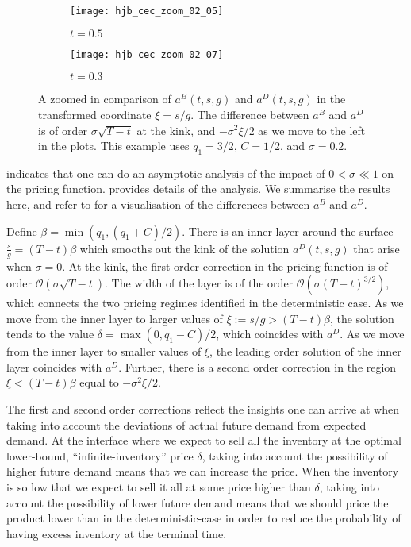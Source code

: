 \documentclass[main.tex]{subfiles}
\begin{document}
\begin{figure}[hbt]
  \centering
  \begin{subfigure}[b]{0.5\textwidth}
    \texttt{[image: hjb\_cec\_zoom\_02\_05]}
    \caption{$t = 0.5$}
  \end{subfigure}%
  \begin{subfigure}[b]{0.5\textwidth}
    \texttt{[image: hjb\_cec\_zoom\_02\_07]}
    \caption{$t=0.3$}
  \end{subfigure}
  \caption{A zoomed in comparison of $a^B(t,s,g)$ and $a^D(t,s,g)$
    in the transformed coordinate $\xi=s/g$.
    The difference between $a^B$ and $a^D$ is of order
    $\sigma\sqrt{T-t}$ at the kink, and
    $-\sigma^2\xi/2$ as we move to the left in the
    plots.
    This example uses $q_1=3/2$, $C=1/2$, and $\sigma=0.2$.
  }\label{fig:hjb_cec_zoom}
\end{figure}
 indicates that one can do an asymptotic analysis
of the impact of $0<\sigma \ll 1$ on the pricing
function.  provides details of the
analysis. We summarise the
results here, and refer to  for a visualisation
of the differences between $a^B$ and $a^D$.
\begin{myresult}\label{res:linear_asymptotics}
  Define $\beta=\min(q_1,(q_1+C)/2)$.
  There is an inner layer around the surface $\frac{s}{g}=(T-t)\beta$ which
  smooths out the kink of the solution $a^D(t,s,g)$ that arise when
  $\sigma=0$. At the kink, the first-order correction in the pricing
  function is of order $\mathcal{O}(\sigma\sqrt{T-t})$.
  The width of the layer is of the order
  $\mathcal{O}(\sigma{(T-t)}^{3/2})$, which connects the two pricing
  regimes identified in the deterministic case.
  As we move from the inner layer to larger values of
  $\xi:=s/g>(T-t)\beta$, the solution
  tends to the value $\delta=\max(0,q_1-C)/2$, which coincides with
  $a^D$. As we move from the inner layer to smaller values of $\xi$,
  the leading order solution of the inner layer coincides with $a^D$.
  Further, there is a second order correction in the region
  $\xi<(T-t)\beta$ equal to $-\sigma^2 \xi/2$.
\end{myresult}

The first and second order corrections reflect the insights one can
arrive at when taking into account the deviations of actual future
demand from expected demand.
At the interface where we expect to sell all the inventory at the
optimal lower-bound, ``infinite-inventory'' price $\delta$, taking
into account the possibility of higher future demand means that we can
increase the price.
When the inventory is so low that we expect to sell it all at some
price higher than $\delta$, taking into account the possibility
of lower future demand means that we should price the product lower than in the
deterministic-case in order to
reduce the probability of having excess inventory at the terminal time.
\end{document}
